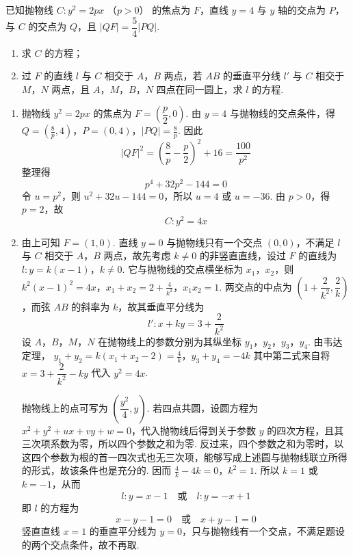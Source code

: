 \begin{problem}
已知抛物线 \(C: y^{2} = 2px\) （\(p > 0\)） 的焦点为 \(F\)，直线 \(y = 4\) 与 \(y\) 轴的交点为 \(P\)，与 \(C\) 的交点为 \(Q\)，且 \(|QF| = \dfrac{5}{4}|PQ|\).

\begin{enumerate}
\item 求 \(C\) 的方程；
\item 过 \(F\) 的直线 \(l\) 与 \(C\) 相交于 \(A\)，\(B\) 两点，若 \(AB\) 的垂直平分线 \(l'\) 与 \(C\) 相交于 \(M\)，\(N\) 两点，且 \(A\)，\(M\)，\(B\)，\(N\) 四点在同一圆上，求 \(l\) 的方程.
\end{enumerate}
\begin{solution}
\begin{enumerate}
\item 抛物线 \(y^{2}=2px\) 的焦点为 \(F=\left(\dfrac p2,0\right)\). 由
\(y=4\) 与抛物线的交点条件，得
\(Q=\left(\frac8p,4\right)\)，\(P=(0,4)\)，\(|PQ|=\frac8p\).
因此
\[
|QF|^{2}=\left(\frac8p-\frac p2\right)^{2}+16
=\frac{100}{p^{2}}
\]
整理得
\[
p^{4}+32p^{2}-144=0
\]
令 \(u=p^{2}\)，则 \(u^{2}+32u-144=0\)，所以
\(u=4\) 或 \(u=-36\). 由 \(p>0\)，得 \(p=2\)，故
\[
C:y^{2}=4x
\]
\item 由上可知 \(F=(1,0)\). 直线 \(y=0\) 与抛物线只有一个交点
\((0,0)\)，不满足 \(l\) 与 \(C\) 相交于 \(A\)，\(B\) 两点，故先考虑
\(k\neq0\) 的非竖直直线，设过 \(F\) 的直线为
\(l:y=k(x-1)\)，\(k\neq0\).
它与抛物线的交点横坐标为 \(x_{1}\)，\(x_{2}\)，则
\(k^{2}(x-1)^{2}=4x\)，\(x_{1}+x_{2}=2+\frac4{k^{2}}\)，\(x_{1}x_{2}=1\).
两交点的中点为 \(\left(1+\dfrac2{k^{2}},\dfrac2k\right)\)，而弦 \(AB\) 的斜率为
\(k\)，故其垂直平分线为
\[
l':x+ky=3+\frac2{k^{2}}
\]
设 \(A\)，\(B\)，\(M\)，\(N\) 在抛物线上的参数分别为其纵坐标
\(y_{1}\)，\(y_{2}\)，\(y_{3}\)，\(y_{4}\). 由韦达定理，
\(y_{1}+y_{2}=k(x_{1}+x_{2}-2)=\frac4k\)，\(y_{3}+y_{4}=-4k\)
其中第二式来自将 \(x=3+\dfrac2{k^{2}}-ky\) 代入 \(y^{2}=4x\).

抛物线上的点可写为 \(\left(\dfrac{y^{2}}4,y\right)\). 若四点共圆，设圆方程为
\(x^{2}+y^{2}+ux+vy+w=0\)，代入抛物线后得到关于参数 \(y\) 的四次方程，且其三次项系数为零，所以四个参数之和为零. 反过来，四个参数之和为零时，以这四个参数为根的首一四次式也无三次项，能够写成上述圆与抛物线联立所得的形式，故该条件也是充分的. 因而
\(\frac4k-4k=0\)，\(k^{2}=1\).
所以 \(k=1\) 或 \(k=-1\)，从而
\[
l:y=x-1\quad\text{或}\quad l:y=-x+1
\]
即 \(l\) 的方程为
\[
x-y-1=0\quad\text{或}\quad x+y-1=0
\]
竖直直线 \(x=1\) 的垂直平分线为 \(y=0\)，只与抛物线有一个交点，不满足题设的两个交点条件，故不再取.
\end{enumerate}
\end{solution}
\end{problem}

